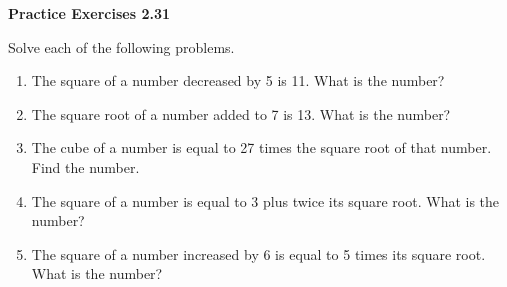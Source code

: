 \vspace{0.3ex}
\noindent\textbf{Practice Exercises 2.31}

\vspace{0.2ex}


Solve each of the following problems. 

\begin{enumerate}[noitemsep, label = \color{blue}\arabic*. ]
    \item The square of a number decreased by 5 is 11. What is the number?    
    \item The square root of a number added to 7 is 13. What is the number?
    \item The cube of a number is equal to 27 times the square root of that number. Find the number.
    \item The square of a number is equal to 3 plus twice its square root. What is the number?
    \item The square of a number increased by 6 is equal to 5 times its square root. What is the number?
\end{enumerate}

